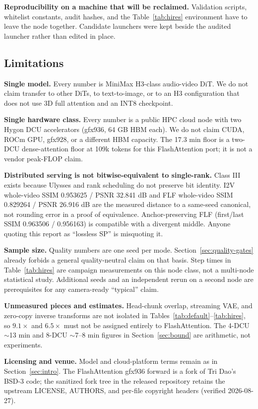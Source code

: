 \documentclass[11pt]{article}
\begin{document}
\textbf{Reproducibility on a machine that will be reclaimed.} Validation scripts, whitelist constants, audit hashes, and the Table~\ref{tab:hires} environment have to leave the node together. Candidate launchers were kept beside the audited launcher rather than edited in place.

\subsection{Limitations}
\label{sec:limits}

\textbf{Single model.} Every number is MiniMax H3-class audio-video DiT. We do not claim transfer to other DiTs, to text-to-image, or to an H3 configuration that does not use 3D full attention and an INT8 checkpoint.

\textbf{Single hardware class.} Every number is a public HPC cloud node with two Hygon DCU accelerators (gfx936, 64 GB HBM each). We do not claim CUDA, ROCm GPU, gfx928, or a different HBM capacity. The 17.3 min floor is a two-DCU dense-attention floor at 109k tokens for this FlashAttention port; it is not a vendor peak-FLOP claim.

\textbf{Distributed serving is not bitwise-equivalent to single-rank.} Class III exists because Ulysses and rank scheduling do not preserve bit identity. I2V whole-video SSIM 0.953625 / PSNR 32.841 dB and FLF whole-video SSIM 0.829264 / PSNR 26.916 dB are the measured distance to a same-seed canonical, not rounding error in a proof of equivalence. Anchor-preserving FLF (first/last SSIM 0.963506 / 0.956163) is compatible with a divergent middle. Anyone quoting this report as ``lossless SP'' is misquoting it.

\textbf{Sample size.} Quality numbers are one seed per mode. Section~\ref{sec:quality-gates} already forbids a general quality-neutral claim on that basis. Step times in Table~\ref{tab:hires} are campaign measurements on this node class, not a multi-node statistical study. Additional seeds and an independent rerun on a second node are prerequisites for any camera-ready ``typical'' claim.

\textbf{Unmeasured pieces and estimates.} Head-chunk overlap, streaming VAE, and zero-copy inverse transforms are not isolated in Tables~\ref{tab:default}--\ref{tab:hires}, so $9.1\times$ and $6.5\times$ must not be assigned entirely to FlashAttention. The 4-DCU $\sim$13 min and 8-DCU $\sim$7--8 min figures in Section~\ref{sec:bound} are arithmetic, not experiments.

\textbf{Licensing and venue.} Model and cloud-platform terms remain as in Section~\ref{sec:intro}. The FlashAttention gfx936 forward is a fork of Tri Dao's BSD-3 code; the sanitized fork tree in the released repository retains the upstream LICENSE, AUTHORS, and per-file copyright headers (verified 2026-08-27).
\end{document}
